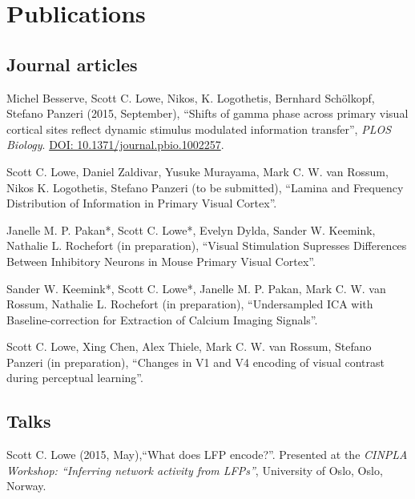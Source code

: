 \documentclass[11pt, a4paper]{article} %
\renewenvironment{itemize}{
  \begin{list}{}{
    \setlength{\leftmargin}{0em}
  }
}{
  \end{list}
}
\begin{document}

\section*{Publications}
%
%
\subsection*{Journal articles}
%
\begin{itemize}
%
\item
Michel Besserve, Scott C. Lowe, Nikos, K. Logothetis, Bernhard Sch\"{o}lkopf, Stefano Panzeri (2015, September), ``Shifts of gamma phase across primary visual cortical sites reflect dynamic stimulus modulated information transfer'', \emph{PLOS Biology}. \href{https://doi.org/10.1371/journal.pbio.1002257}{DOI: 10.1371/journal.pbio.1002257}.\\
%
\item
Scott C. Lowe, Daniel Zaldivar, Yusuke Murayama, Mark C. W. van Rossum, Nikos K. Logothetis, Stefano Panzeri (to be submitted), ``Lamina and Frequency Distribution of Information in Primary Visual Cortex''.%
\item
Janelle M. P. Pakan*, Scott C. Lowe*, Evelyn Dylda, Sander W. Keemink, Nathalie L. Rochefort (in preparation), ``Visual Stimulation Supresses Differences Between Inhibitory Neurons in Mouse Primary Visual Cortex''.
%
\item
Sander W. Keemink*, Scott C. Lowe*, Janelle M. P. Pakan, Mark C. W. van Rossum, Nathalie L. Rochefort (in preparation), ``Undersampled ICA with Baseline-correction for Extraction of Calcium Imaging Signals''.
%
\item
Scott C. Lowe, Xing Chen, Alex Thiele, Mark C. W. van Rossum, Stefano Panzeri (in preparation), ``Changes in V1 and V4 encoding of visual contrast during perceptual learning''.
%
\end{itemize}
%
%
\subsection*{Talks}
%
\begin{itemize}
%
\item
Scott C. Lowe (2015, May),``What does LFP encode?''.
{Presented at the \emph{CINPLA Workshop: ``Inferring network activity from LFPs''}, University of Oslo, Oslo, Norway.}
%
\end{itemize}
\end{document}
